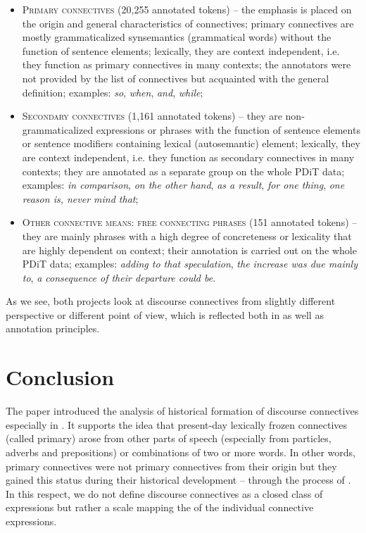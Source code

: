 \documentclass[output=paper]{langsci/langscibook.cls}
\begin{document}
\begin{itemize}

\item \textsc{Primary connectives} (20,255 annotated tokens) – 
the emphasis is placed on the origin and general characteristics of connectives; primary connectives are mostly grammaticalized synsemantics (grammatical words) without the function of sentence elements; lexically, they are context independent, i.e. they function as primary connectives in many contexts; the annotators were not provided by the list of connectives but acquainted with the general definition; examples: \textit{so}, \textit{when}, \textit{and}, \textit{while}; 


\item \textsc{Secondary connectives} (1,161 annotated tokens) – 
they are non-grammaticalized expressions or phrases with the function of sentence elements or sentence modifiers containing lexical (autosemantic) element; lexically, they are context independent, i.e. they function as secondary connectives in many contexts; they are annotated as a separate group on the whole PDiT data; examples: \textit{in comparison}, \textit{on the other hand}, \textit{as a result}, \textit{for one thing}, \textit{one reason is, never mind that};


\item \textsc{Other connective means: free connecting phrases} (151 annotated tokens) – they are mainly  phrases with a high degree of concreteness or lexicality that are highly dependent on context; their annotation is carried out on the whole PDiT data; examples: \textit{adding to that speculation}, \textit{the increase was due mainly to}, \textit{a consequence of their departure could be}.

\end{itemize}

As we see, both projects look at discourse connectives from slightly different perspective or different point of view, which is reflected both in  as well as annotation principles.


\section{Conclusion}


The paper introduced the analysis of historical formation of discourse connectives especially in . It supports the idea that present-day lexically frozen connectives (called primary) arose from other parts of speech (especially from particles, adverbs and prepositions) or combinations of two or more words. In other words, primary connectives were not primary connectives from their origin but they gained this status during their historical development – through the process of . In this respect, we do not define discourse connectives as a closed class of expressions but rather a scale mapping the  of the individual connective expressions. 
\end{document}
